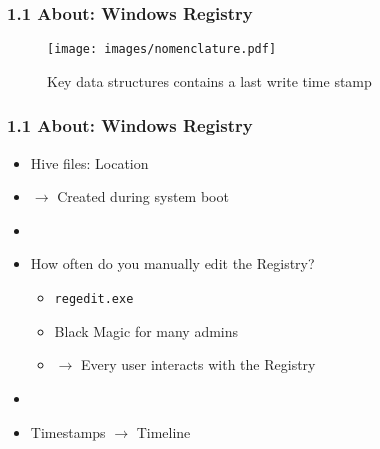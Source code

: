 \begin{frame}[fragile]
  \frametitle{1.1 About: Windows Registry}
    \begin{figure}
        \texttt{[image: images/nomenclature.pdf]}
        \captionsetup{labelformat=empty,labelsep=none}
        \caption[]{\tiny Key data structures contains a last write time stamp}
    \end{figure}
\end{frame}


\begin{frame}[fragile]
  \frametitle{1.1 About: Windows Registry}
    \begin{itemize}
        \item Hive files: Location
        \item[] $\to$ Created during system boot
	\item[]
        \item How often do you manually edit the Registry?
            \begin{itemize}
		\item \texttt{regedit.exe}
                \item Black Magic for many admins
		\item[] $\to$ Every user interacts with the Registry
            \end{itemize}
	\item[]
        \item Timestamps $\to$ Timeline
    \end{itemize}
\end{frame}


